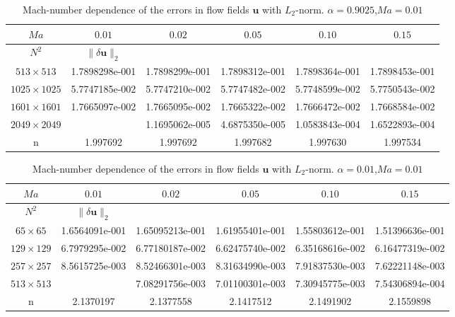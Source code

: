 \documentclass{article}
\begin{document}
\begin{table*}[!ht]
\centering
\caption{Mach-number dependence of the errors in flow fields $\bm u$ with $L_2$-norm. $\alpha=0.9025$,$Ma=0.01$}
\label{tab:mach}
\begin{tabular}{cccccc}
\hline
 $Ma$   & $0.01$       &$0.02$& $0.05$  & $0.10$ & $0.15$\\
 \hline
 $N^2$  & $\|\delta \bm{u}\|_2$&     &      &   &   \\
 \hline
 $513\times513$    & 1.7898298e-001 & 1.7898299e-001   & 1.7898312e-001&   1.7898364e-001&  1.7898453e-001\\
 $1025\times1025$  & 5.7747185e-002 & 5.7747210e-002   & 5.7747482e-002&   5.7748599e-002&  5.7750543e-002\\
 $1601\times1601$  & 1.7665097e-002 & 1.7665095e-002   & 1.7665322e-002&   1.7666472e-002&  1.7668584e-002\\
 $2049\times2049$  &                & 1.1695062e-005   & 4.6875350e-005&   1.0583843e-004&  1.6522893e-004\\
\hline
 n    & 1.997692   & 1.997692       & 1.997682         & 1.997630      &   1.997534\\
\hline
\end{tabular}

\end{table*}

\begin{table*}[!ht]
\centering
\caption{Mach-number dependence of the errors in flow fields $\bm u$ with $L_2$-norm. $\alpha=0.01$,$Ma=0.01$}
\label{tab:machsolid}
\begin{tabular}{cccccc}
\hline
 $Ma$   & $0.01$       &$0.02$& $0.05$  & $0.10$ & $0.15$\\
 \hline
 $N^2$  & $\|\delta \bm{u}\|_2$&     &      &   &   \\
 \hline
 $65\times65$    & 1.6564091e-001 & 1.65095213e-001   & 1.61955401e-001&   1.55803612e-001&  1.51396636e-001\\
 $129\times129$  & 6.7979295e-002 & 6.77180187e-002   & 6.62475740e-002&   6.35168616e-002&  6.16477319e-002\\
 $257\times257$  & 8.5615725e-003 & 8.52466301e-003   & 8.31634990e-003&   7.91837530e-003&  7.62221148e-003\\
 $513\times513$  &                & 7.08291756e-003   & 7.01100301e-003&   7.30945775e-003&  7.54306894e-004\\
\hline
 n    & 2.1370197   & 2.1377558   & 2.1417512        & 2.1491902      &  2.1559898\\
\hline
\end{tabular}

\end{table*}
\end{document}
